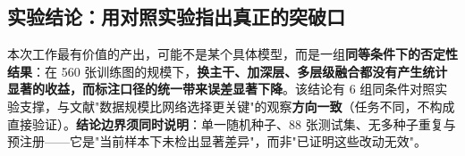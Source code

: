 \documentclass[UTF8,a4paper,10pt]{ctexart}
\begin{document}
\subsection{实验结论：用对照实验指出真正的突破口}

本次工作最有价值的产出，可能不是某个具体模型，而是一组\textbf{同等条件下的否定性结果}：在 560 张训练图的规模下，\textbf{换主干、加深层、多层级融合都没有产生统计显著的收益，而标注口径的统一带来误差显著下降}。该结论有 6 组同条件对照实验支撑，与文献\cite{lawley2024network}"数据规模比网络选择更关键"的观察\textbf{方向一致}（任务不同，不构成直接验证）。\textbf{结论边界须同时说明}：单一随机种子、88 张测试集、无多种子重复与预注册——它是"当前样本下未检出显著差异"，而非"已证明这些改动无效"。

\vspace{0.4em}


\begingroup
\footnotesize
\linespread{0.92}\selectfont
\setlength{\bibsep}{1pt plus 0.3pt}
\setlength{\parskip}{0pt}


\endgroup
\end{document}
